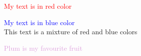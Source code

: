 \documentclass{article}
\begin{document}
	\pagecolor{Goldenrod!50}
	
	\textcolor{red}{My text is in red color}   
    
	\textcolor{blue}{My text is in blue color}       \\
	
	\textcolor{red!50!blue}{This text is a mixture of red and blue colors}
	
	\textcolor{Plum}{Plum is my favourite fruit}
\end{document}
